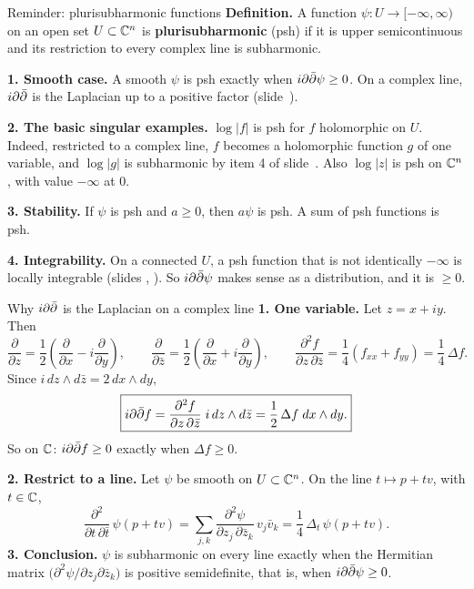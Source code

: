 \begin{frame}{Reminder: plurisubharmonic functions}
\textbf{Definition.} A function \(\psi:U\to[-\infty,\infty)\) on an open set \(U\subset\mathbb C^n\) is \textbf{plurisubharmonic} (psh) if it is upper semicontinuous and its restriction to every complex line is subharmonic.
\par\medskip
\textbf{1. Smooth case.} A smooth \(\psi\) is psh exactly when \(i\partial\bar\partial\psi\ge0\). On a complex line, \(i\partial\bar\partial\) is the Laplacian up to a positive factor (slide~\hyperlink{fr:ddbar-laplacian}{\pageref{fr:ddbar-laplacian}}).
\par\medskip
\textbf{2. The basic singular examples.} \(\log|f|\) is psh for \(f\) holomorphic on \(U\). Indeed, restricted to a complex line, \(f\) becomes a holomorphic function \(g\) of one variable, and \(\log|g|\) is subharmonic by item 4 of slide~\hyperlink{fr:the-basic-example-z-36}{\pageref{fr:the-basic-example-z-36}}. Also \(\log|z|\) is psh on \(\mathbb C^n\), with value \(-\infty\) at \(0\).
\par\medskip
\textbf{3. Stability.} If \(\psi\) is psh and \(a\ge0\), then \(a\psi\) is psh. A sum of psh functions is psh.
\par\medskip
\textbf{4. Integrability.} On a connected \(U\), a psh function that is not identically \(-\infty\) is locally integrable (slides \hyperlink{fr:log-pole}{\pageref{fr:log-pole}}, \hyperlink{fr:psh-integrable}{\pageref{fr:psh-integrable}}). So \(i\partial\bar\partial\psi\) makes sense as a distribution, and it is \(\ge0\).
\end{frame}

\begin{frame}{Why \(i\partial\bar\partial\) is the Laplacian on a complex line}
\label{fr:ddbar-laplacian}
\textbf{1. One variable.} Let \(z=x+iy\). Then
\[
\frac{\partial}{\partial z}=\frac12\left(\frac{\partial}{\partial x}-i\frac{\partial}{\partial y}\right),\qquad
\frac{\partial}{\partial\bar z}=\frac12\left(\frac{\partial}{\partial x}+i\frac{\partial}{\partial y}\right),\qquad
\frac{\partial^2f}{\partial z\,\partial\bar z}=\frac14\left(f_{xx}+f_{yy}\right)=\frac14\,\Delta f.
\]
Since \(i\,dz\wedge d\bar z=2\,dx\wedge dy\),
\[
\boxed{i\partial\bar\partial f=\frac{\partial^2f}{\partial z\,\partial\bar z}\;i\,dz\wedge d\bar z=\frac12\,\Delta f\;dx\wedge dy.}
\]
So on \(\mathbb C\): \(i\partial\bar\partial f\ge0\) exactly when \(\Delta f\ge0\).
\par\medskip
\textbf{2. Restrict to a line.} Let \(\psi\) be smooth on \(U\subset\mathbb C^n\). On the line \(t\mapsto p+tv\), with \(t\in\mathbb C\),
\[
\frac{\partial^2}{\partial t\,\partial\bar t}\,\psi(p+tv)
=\sum_{j,k}\frac{\partial^2\psi}{\partial z_j\,\partial\bar z_k}\,v_j\bar v_k
=\frac14\,\Delta_t\,\psi(p+tv).
\]
\textbf{3. Conclusion.} \(\psi\) is subharmonic on every line exactly when the Hermitian matrix \(\bigl(\partial^2\psi/\partial z_j\partial\bar z_k\bigr)\) is positive semidefinite, that is, when \(i\partial\bar\partial\psi\ge0\).
\end{frame}

